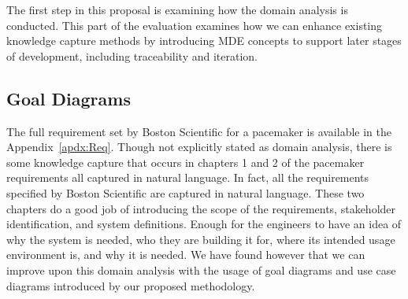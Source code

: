 %

The first step in this proposal is examining how the domain analysis is conducted. This part of the evaluation examines how we can enhance existing knowledge capture methods by introducing \ac{MDE} concepts to support later stages of development, including traceability and iteration.

\subsection{Goal Diagrams}

The full requirement set by Boston Scientific for a pacemaker is available in the Appendix~\ref{apdx:Req}. Though not explicitly stated as domain analysis, there is some knowledge capture that occurs in chapters 1 and 2 of the pacemaker requirements all captured in natural language. In fact, all the requirements specified by Boston Scientific are captured in natural language. These two chapters do a good job of introducing the scope of the requirements, stakeholder identification, and system definitions. Enough for the engineers to have an idea of why the system is needed, who they are building it for, where its intended usage environment is, and why it is needed. We have found however that we can improve upon this domain analysis with the usage of goal diagrams and use case diagrams introduced by our proposed methodology.

